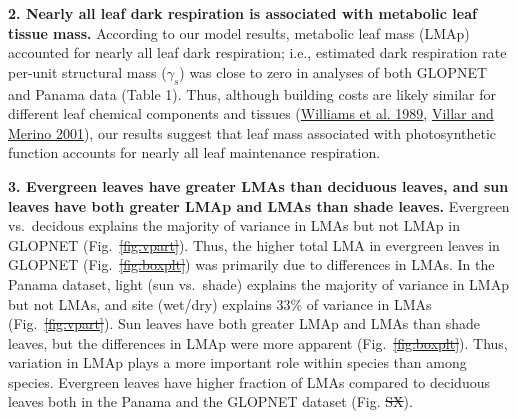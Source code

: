 \documentclass[
  12pt,
  a4paper,
,tablecaptionabove
]{scrartcl}
\providecommand{\DIFaddtex}[1]{{\protect\color{blue}\uwave{#1}}} %
\providecommand{\DIFdeltex}[1]{{\protect\color{red}\sout{#1}}}                      %
\providecommand{\DIFaddbegin}{} %
\providecommand{\DIFaddend}{} %
\providecommand{\DIFdelbegin}{} %
\providecommand{\DIFdelend}{} %
\providecommand{\DIFadd}[1]{\texorpdfstring{\DIFaddtex{#1}}{#1}} %
\providecommand{\DIFdel}[1]{\texorpdfstring{\DIFdeltex{#1}}{}} %
\newcommand{\DIFscaledelfig}{0.5}
\newlength{\DIFdelgraphicswidth} %
\newlength{\DIFdelgraphicsheight} %
\newcommand{\DIFaddincludegraphics}[2][]{{\color{blue}\fbox{\DIFOincludegraphics[#1]{#2}}}} %
\newcommand{\DIFdelincludegraphics}[2][]{%
\sbox{\DIFdelgraphicsbox}{\DIFOincludegraphics[#1]{#2}}%
\settoboxwidth{\DIFdelgraphicswidth}{\DIFdelgraphicsbox} %
\settoboxtotalheight{\DIFdelgraphicsheight}{\DIFdelgraphicsbox} %
\scalebox{\DIFscaledelfig}{%
\parbox[b]{\DIFdelgraphicswidth}{\usebox{\DIFdelgraphicsbox}\\[-\baselineskip] \rule{\DIFdelgraphicswidth}{0em}}\llap{\resizebox{\DIFdelgraphicswidth}{\DIFdelgraphicsheight}{%
\setlength{\unitlength}{\DIFdelgraphicswidth}%
\begin{picture}(1,1)%
\thicklines\linethickness{2pt} %
{\color[rgb]{1,0,0}\put(0,0){\framebox(1,1){}}}%
{\color[rgb]{1,0,0}\put(0,0){\line( 1,1){1}}}%
{\color[rgb]{1,0,0}\put(0,1){\line(1,-1){1}}}%
\end{picture}%
}\hspace*{3pt}}} %
} %
\DeclareRobustCommand{\DIFaddbegin}{\DIFOaddbegin \let\includegraphics\DIFaddincludegraphics} %
\DeclareRobustCommand{\DIFaddend}{\DIFOaddend \let\includegraphics\DIFOincludegraphics} %
\DeclareRobustCommand{\DIFdelbegin}{\DIFOdelbegin \let\includegraphics\DIFdelincludegraphics} %
\DeclareRobustCommand{\DIFdelend}{\DIFOaddend \let\includegraphics\DIFOincludegraphics} %
\begin{document}
\textbf{2. Nearly all leaf dark respiration is associated with metabolic
leaf tissue mass.} According to our model results, metabolic leaf mass
(LMAp) accounted for nearly all leaf dark respiration; i.e., estimated
dark respiration rate per-unit structural mass (\(\gamma_s\)) was close
to zero in analyses of both GLOPNET and Panama data (Table 1). Thus,
although building costs are likely similar for different leaf chemical
components and tissues (\protect\hyperlink{ref-Williams1989}{Williams et
al. 1989}, \protect\hyperlink{ref-Villar2001}{Villar and Merino 2001}),
our results suggest that leaf mass associated with photosynthetic
function accounts for nearly all leaf maintenance respiration.

\textbf{3. Evergreen leaves have greater LMAs than deciduous leaves, and
sun leaves have both greater LMAp and LMAs than shade leaves.} Evergreen
vs.~decidous explains the majority of variance in LMAs but not LMAp in
GLOPNET (Fig.~\DIFdelbegin \DIFdel{\ref{fig:vpart}}\DIFdelend \DIFaddbegin \DIFadd{\ref{fig-vpart}}\DIFaddend ). Thus, the higher total LMA in evergreen
leaves in GLOPNET (Fig.~\DIFdelbegin \DIFdel{\ref{fig:boxplt}}\DIFdelend \DIFaddbegin \DIFadd{\ref{fig-boxplt}}\DIFaddend ) was primarily due to
differences in LMAs. In the Panama dataset, light (sun vs.~shade)
explains the majority of variance in LMAp but not LMAs, and site
(wet/dry) explains 33\% of variance in LMAs (Fig.~\DIFdelbegin \DIFdel{\ref{fig:vpart}}\DIFdelend \DIFaddbegin \DIFadd{\ref{fig-vpart}}\DIFaddend ). Sun
leaves have both greater LMAp and LMAs than shade leaves, but the
differences in LMAp were more apparent (Fig.~\DIFdelbegin \DIFdel{\ref{fig:boxplt}}\DIFdelend \DIFaddbegin \DIFadd{\ref{fig-boxplt}}\DIFaddend ). Thus,
variation in LMAp plays a more important role within species than among
species. Evergreen leaves have higher fraction of LMAs compared to
deciduous leaves both in the Panama and the GLOPNET dataset (Fig.
\DIFdelbegin \DIFdel{SX}\DIFdelend \DIFaddbegin \DIFadd{S\ref{fig-box_frac}}\DIFaddend ).
\end{document}
